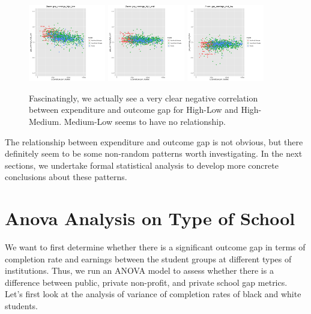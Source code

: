 \documentclass{article}
\begin{document}
\begin{figure}[H]
\centering
\includegraphics[width=0.3\textwidth]{../images/eda_scatterplots/gap_earnings_high_low_zoom.png}
\includegraphics[width=0.3\textwidth]{../images/eda_scatterplots/gap_earnings_high_mid_zoom.png}
\includegraphics[width=0.3\textwidth]{../images/eda_scatterplots/gap_earnings_mid_low_zoom.png}
\caption{\label{fig:ZoomEarnings} Fascinatingly, we actually see a very clear negative correlation between expenditure and outcome gap for High-Low and High-Medium. Medium-Low seems to have no relationship.}
\end{figure}

The relationship between expenditure and outcome gap is not obvious, but there definitely seem to be some non-random patterns worth investigating. In the next sections, we undertake formal statistical analysis to develop more concrete conclusions about these patterns.




\section{Anova Analysis on Type of School}

We want to first determine whether there is a significant outcome gap in terms of completion rate and earnings between the student groups at different types of institutions. Thus, we run an ANOVA model to assess whether there is a difference between public, private non-profit, and private school gap metrics. Let's first look at the analysis of variance of completion rates of black and white students.
\end{document}
